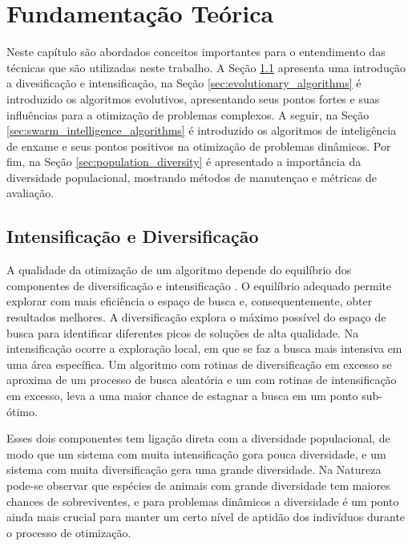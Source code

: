 \chapter{Fundamentação Teórica}
\label{ch:fundamentos}

Neste capítulo são abordados conceitos importantes para o entendimento das técnicas que são utilizadas neste trabalho. A Seção \ref{sec:intesification_diversification} apresenta uma introdução a divesificação e intensificação, na Seção \ref{sec:evolutionary_algorithms} é introduzido os algoritmos evolutivos, apresentando seus pontos fortes e suas influências para a otimização de problemas complexos. A seguir, na Seção \ref{sec:swarm_intelligence_algorithms} é introduzido os algoritmos de inteligência de enxame e seus pontos positivos na otimização de problemas dinâmicos. Por fim, na Seção \ref{sec:population_diversity} é apresentado a importância da diversidade populacional, mostrando métodos de manutençao e métricas de avaliação.

\section{Intensificação e Diversificação}
\label{sec:intesification_diversification}

A qualidade da otimização de um algoritmo depende do equilíbrio dos componentes de diversificação e intensificação \cite{vcrepinvsek2013exploration}. O equilíbrio adequado permite explorar com mais eficiência o espaço de busca e, consequentemente, obter resultados melhores. A diversificação explora o máximo possível do espaço de busca para identificar diferentes picos de soluções de alta qualidade. Na intensificação ocorre a exploração local, em que se faz a busca mais intensiva em uma área específica. Um algoritmo com rotinas de diversificação em excesso se aproxima de um processo de busca aleatória e um com rotinas de intensificação em excesso, leva a uma maior chance de estagnar a busca em um ponto sub-ótimo. 

Esses dois componentes tem ligação direta com a diversidade populacional, de modo que um sistema com muita intensificação gora pouca diversidade, e um sistema com muita diversificação gera uma grande diversidade. Na Natureza pode-se observar que espécies de animais com grande diversidade tem maiores chances de sobreviventes, e para problemas dinâmicos a diversidade é um ponto ainda mais crucial para manter um certo nível de aptidão dos indivíduos durante o processo de otimização.

